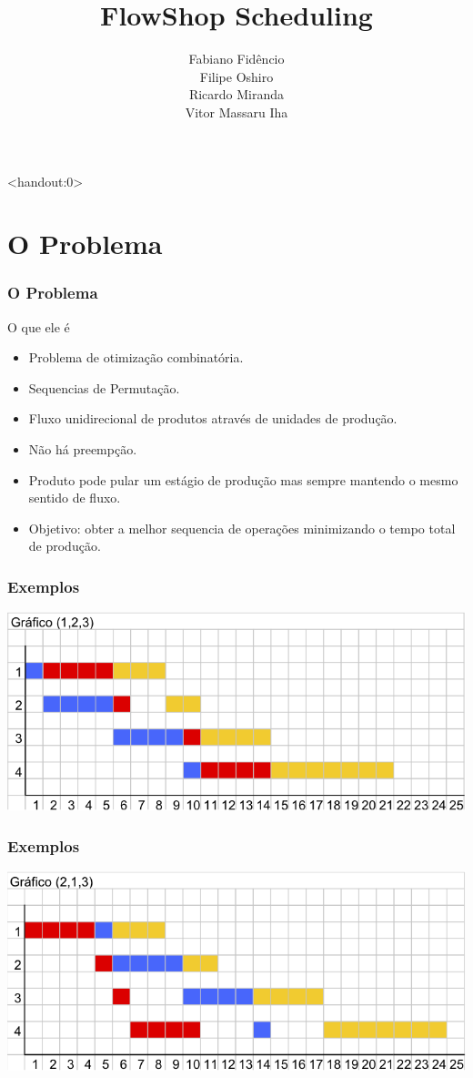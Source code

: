 \documentclass[12pt]{beamer}
\title{FlowShop Scheduling}
\author[Fidêncio,Oshiro,Miranda,Iha]{Fabiano Fidêncio\\ Filipe Oshiro\\ Ricardo Miranda\\ Vitor Massaru Iha}
\institute[IC-UNICAMP]{Instituto de Computação - UNICAMP}
\begin{document}
\begin{frame}<handout:0>
	\titlepage 
\end{frame}


\section{O Problema}
\begin{frame}
	\frametitle{O Problema}
	\begin{block}{O que ele é}
		\begin{itemize}
			\item Problema de otimização combinatória.	\pause
			\item Sequencias de Permutação.	\pause
			\item Fluxo unidirecional de produtos através de unidades de produção. 	\pause
			\item Não há preempção.	\pause
			\item Produto pode pular um estágio de produção mas sempre mantendo o mesmo sentido de fluxo. \pause
			\item Objetivo: obter a melhor sequencia de operações minimizando o tempo total de produção. \pause
		\end{itemize}
	\end{block}
\end{frame}
\begin{frame}
	\frametitle{Exemplos}
	\includegraphics[scale=.6]{graph1} 
\end{frame}
\begin{frame}
	\frametitle{Exemplos}
	\includegraphics[scale=.6]{graph2} 
\end{frame}
\end{document}
